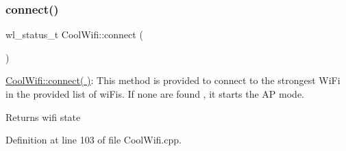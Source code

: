\subsubsection{\texorpdfstring{connect()}{connect()}}
{\footnotesize\ttfamily wl\+\_\+status\+\_\+t Cool\+Wifi\+::connect (\begin{DoxyParamCaption}{ }\end{DoxyParamCaption})}

\hyperlink{class_cool_wifi_ad060353050f40d032a2dbf9e54a768bf}{Cool\+Wifi\+::connect( )}\+: This method is provided to connect to the strongest Wi\+Fi in the provided list of wi\+Fis. If none are found , it starts the AP mode.

\begin{DoxyReturn}{Returns}
wifi state 
\end{DoxyReturn}


Definition at line 103 of file Cool\+Wifi.\+cpp.


